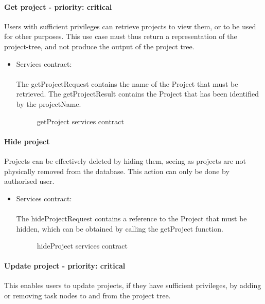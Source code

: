 \paragraph{Get project - priority: critical}
Users with sufficient privileges can retrieve projects to view them, or to be used for other purposes. This use case must thus return a representation of the project-tree, and not produce the output of the project tree.

\begin{itemize}
	\item Services contract:\\ \\
	The getProjectRequest contains the name of the Project that must be retrieved. The getProjectResult contains the Project that has been identified by the projectName.
	\begin{figure}[H]
    	\centering
    	\caption{getProject services contract}
    	\label{fig:getProject_services_contract}
   	\end{figure}
\end{itemize}

\paragraph{Hide project}
Projects can be effectively deleted by hiding them, seeing as projects are not physically removed from the database. This action can only be done by authorised user.

\begin{itemize}
	\item Services contract:\\ \\
	The hideProjectRequest contains a reference to the Project that must be hidden, which can be obtained by calling the getProject function.
	\begin{figure}[H]
    	\centering
    	\caption{hideProject services contract}
    	\label{fig:hideProject_services_contract}
   	\end{figure}
\end{itemize}


\paragraph{Update project - priority: critical}
This enables users to update projects, if they have sufficient privileges, by adding or removing task nodes to and from the project tree.

